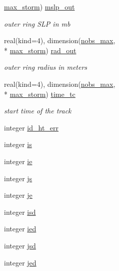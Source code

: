 \begin{DoxyCompactItemize}
\hyperlink{classfv__nwp__nudge__mod_aac3d8d546e1954263ae52400f44d2c7c}{max\-\_\-storm}) \hyperlink{classfv__nwp__nudge__mod_ad0231a73a4870ec8743ecd19e7181b11}{mslp\-\_\-out}
\begin{DoxyCompactList}\small\item\em outer ring S\-L\-P in mb \end{DoxyCompactList}\item 
real(kind=4), dimension(\hyperlink{classfv__nwp__nudge__mod_ac3d3a0cbdfff5f6ed3757fcc2b70309d}{nobs\-\_\-max}, \\*
\hyperlink{classfv__nwp__nudge__mod_aac3d8d546e1954263ae52400f44d2c7c}{max\-\_\-storm}) \hyperlink{classfv__nwp__nudge__mod_a406dba8bb90cbab343bb92bf5cef1f58}{rad\-\_\-out}
\begin{DoxyCompactList}\small\item\em outer ring radius in meters \end{DoxyCompactList}\item 
real(kind=4), dimension(\hyperlink{classfv__nwp__nudge__mod_ac3d3a0cbdfff5f6ed3757fcc2b70309d}{nobs\-\_\-max}, \\*
\hyperlink{classfv__nwp__nudge__mod_aac3d8d546e1954263ae52400f44d2c7c}{max\-\_\-storm}) \hyperlink{classfv__nwp__nudge__mod_a943f847873f99de2546f21b2ec1a3a9e}{time\-\_\-tc}
\begin{DoxyCompactList}\small\item\em start time of the track \end{DoxyCompactList}\item 
integer \hyperlink{classfv__nwp__nudge__mod_aff11af198e7507203fac0b6fc479060d}{id\-\_\-ht\-\_\-err}
\item 
integer \hyperlink{classfv__nwp__nudge__mod_a635b34cbb0a0b285d6febfa4646c6993}{is}
\item 
integer \hyperlink{classfv__nwp__nudge__mod_a11b27e9ca5d61dc084748127098af2fb}{ie}
\item 
integer \hyperlink{classfv__nwp__nudge__mod_ad9f936f9336b43e00bcc6fa4fd1d4f6a}{js}
\item 
integer \hyperlink{classfv__nwp__nudge__mod_aec115c5d43df5f25250c9a3cd359f177}{je}
\item 
integer \hyperlink{classfv__nwp__nudge__mod_a7d1486af2ea75f210ba0c7d08952fe68}{isd}
\item 
integer \hyperlink{classfv__nwp__nudge__mod_a49d07573330869c0885c65c2ef35d8f4}{ied}
\item 
integer \hyperlink{classfv__nwp__nudge__mod_a14a29353676e857e25063a675a4700d8}{jsd}
\item 
integer \hyperlink{classfv__nwp__nudge__mod_a6354a59117d0add11183736f6f9c055a}{jed}
\end{DoxyCompactItemize}


